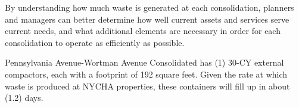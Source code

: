 
    By understanding how much waste is generated at each consolidation, planners and managers
    can better determine how well current assets and services serve current needs, and what additional 
    elements are necessary in order for each consolidation to operate as efficiently as possible. 

    Pennsylvania Avenue-Wortman Avenue Consolidated has (1) 30-CY external compactors, each with a footprint of 192 square feet. Given the rate at which waste is produced at NYCHA properties, these containers will fill
    up in about (1.2) days.